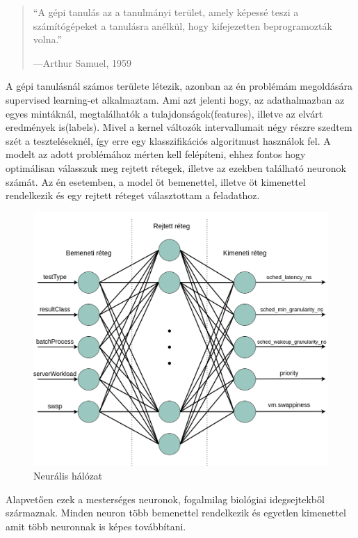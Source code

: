 \begin{quote}
``A gépi tanulás az a tanulmányi terület, amely képessé teszi a számítógépeket a tanulásra
anélkül, hogy kifejezetten beprogramozták volna.''
\par\nobreak\smallskip\hfill—Arthur Samuel, 1959
\end{quote}

A gépi tanulásnál számos területe létezik, azonban az én problémám megoldására supervised learning-et alkalmaztam. Ami azt jelenti hogy, az adathalmazban az egyes mintáknál, megtalálhatók a tulajdonságok(features), illetve az elvárt eredmények is(labels).
Mivel a kernel változók intervallumait négy részre szedtem szét a teszteléseknél, így erre egy klasszifikációs algoritmust használok fel.
A modelt az adott problémához mérten kell felépíteni, ehhez fontos hogy optimálisan válasszuk meg rejtett rétegek, illetve az ezekben található neuronok számát.
Az én esetemben, a model öt bemenettel, illetve öt kimenettel rendelkezik és egy rejtett réteget választottam a feladathoz.

\begin{figure}[h!]
\centering
\includegraphics[scale=0.3]{images/neuralNetwork.png}
\caption{Neurális hálózat}
\label{fig:neuralnetwork}
\end{figure}

Alapvetően ezek a mesterséges neuronok, fogalmilag biológiai idegsejtekből származnak.
Minden neuron több bemenettel rendelkezik és egyetlen kimenettel amit több neuronnak is képes továbbítani.

